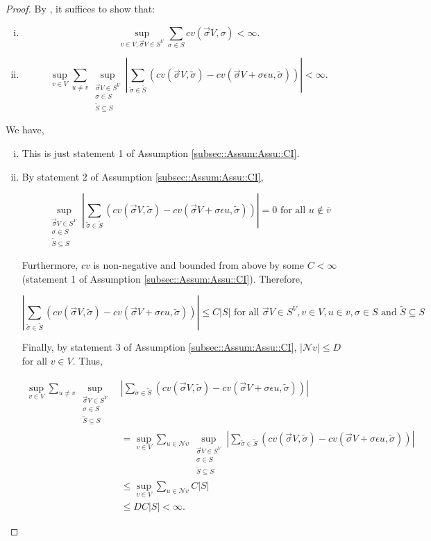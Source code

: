 \documentclass[12pt]{article}
\newcommand{\mc}{\mathcal}
\newcommand{\ov}{\overline}
\newcommand{\te}{\text}
\newcommand{\ep}{\epsilon}
\renewcommand{\v}{v}							%
\newcommand{\vv}{u}								%
\renewcommand{\S}{S}							%
\newcommand{\s}{\sigma}							%
\newcommand{\sv}{\vec{\s}}						%
\newcommand{\ev}{\ep}							%
\newcommand{\IGr}{c}							%
\newcommand{\neigh}{\mc{N}}						%
\newcommand{\cl}{\ov}							%
\newcommand{\const}{C}							%
\newcommand{\degr}{D}							%
\renewcommand{\ss}{\tilde{\s}}					%
\renewcommand{\SS}{\tilde{\S}}					%
\begin{document}
\begin{proof}
By \cite[Theorem 3.9 (a) and (b)]{Lig85}, it suffices to show that:

\begin{enumerate}[i)]
\item 

\[\sup_{\v \in  V,\sv{}{ V} \in \S^ V} \sum_{\s \in \S} \IGr{\v}(\sv{}{ V},\s) < \infty.\]

\item 

\[\sup_{\v\in  V}\sum_{\vv\neq \v} \sup_{\substack{\sv{}{ V} \in \S^ V\\ \s\in \S\\ \SS \subseteq \S}} \left|\sum_{\ss \in \SS} (\IGr{\v}(\sv{}{ V},\ss) - \IGr{\v}(\sv{}{ V}+\s \ev{\vv},\ss))\right| < \infty.\]
\end{enumerate}

We have,

\begin{enumerate}[i)]
\item This is just statement 1 of Assumption \ref{subsec::Assum:Assu::CI}.

\item By statement 2 of Assumption \ref{subsec::Assum:Assu::CI}, 

\[\sup_{\substack{\sv{}{ V} \in \S^ V\\ \s\in \S\\ \SS\subseteq \S}} \left|\sum_{\ss \in \SS} (\IGr{\v}(\sv{}{ V},\ss) - \IGr{\v}(\sv{}{ V}+\s \ev{\vv},\ss))\right| = 0 \te{ for all } \vv \notin \cl{\v}\]

Furthermore, \(\IGr{\v}\) is non-negative and bounded from above by some \(\const{} < \infty\) (statement 1 of Assumption \ref{subsec::Assum:Assu::CI}). Therefore, 

\[\left|\sum_{\ss \in \SS} (\IGr{\v}(\sv{}{ V},\ss) - \IGr{\v}(\sv{}{ V}+\s\ev{\vv},\ss))\right| \leq \const{}|\S| \te{ for all } \sv{}{ V} \in \S^ V,\v \in  V, \vv \in \cl{\v}, \s \in \S \te{ and } \SS\subseteq \S\]

Finally, by statement 3 of Assumption \ref{subsec::Assum:Assu::CI}, \(|\neigh{\v}| \leq \degr\) for all \(\v \in  V\). Thus,

\begin{align*}
\sup_{\v\in  V}\sum_{\vv \neq \v} \sup_{\substack{\sv{}{ V} \in \S^ V\\ \s\in \S\\ \SS\subseteq \S}}& \left|\sum_{\ss \in \SS} (\IGr{\v}(\sv{}{ V},\ss) - \IGr{\v}(\sv{}{ V}+\s\ev{\vv},\ss))\right|\\
&  = \sup_{\v\in  V}\sum_{\vv\in \neigh{\v}} \sup_{\substack{\sv{}{ V} \in \S^ V\\ \s\in \S\\ \SS\subseteq \S}} \left|\sum_{\ss \in \SS} (\IGr{\v}(\sv{}{ V},\ss) - \IGr{\v}(\sv{}{ V}+\s\ev{\vv},\ss))\right|\\
&\leq \sup_{\v\in  V} \sum_{\vv \in \neigh{\v}} \const{}|\S|\\
&\leq \degr \const{}|\S| < \infty.
\end{align*}


\end{enumerate}
\end{proof}
\end{document}

